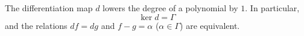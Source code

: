 The differentiation map $d$ lowers the degree of a polynomial by $1$. In particular,
$$\ker d = \Gamma$$
and the relations $df = dg$ and $f - g = \alpha$ ($\alpha \in \Gamma$) are equivalent.
